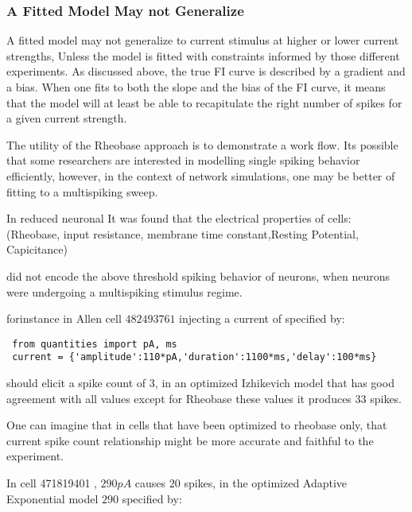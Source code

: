 \subsubsection{A Fitted Model May not Generalize}
A fitted model may not generalize to current stimulus at higher or lower current strengths, Unless the model is fitted with constraints informed by those different experiments. As discussed above, the true FI curve is described by a gradient and a bias. When one fits to both the slope and the bias of the FI curve, it means that the model will at least be able to recapitulate the right number of spikes for  a given current strength. %

%

The utility of the Rheobase approach is to demonstrate a work flow. Its possible that some researchers are interested in modelling single spiking behavior efficiently, however, in the context of network simulations, one may be better of fitting to a multispiking sweep.

In reduced neuronal It was found that the electrical properties of cells:
 (Rheobase, input resistance, membrane time constant,Resting Potential, Capicitance)

 did not encode the above threshold spiking behavior of neurons, when neurons were undergoing a multispiking stimulus regime.

 forinstance in Allen cell $482493761$ injecting a current of 
 specified by:
 \begin{verbatim}
 from quantities import pA, ms
 current = {'amplitude':110*pA,'duration':1100*ms,'delay':100*ms}
 \end{verbatim}
 should elicit a spike count of $3$, in an optimized Izhikevich model that has good agreement with all values except for Rheobase these values it produces $33$ spikes.

One can imagine that in cells that have been optimized to rheobase only, that current spike count relationship might be more  accurate and faithful to the experiment.

In cell 471819401 , $290 pA$ causes $20$ spikes,
in the optimized Adaptive Exponential model $290$
specified by:

